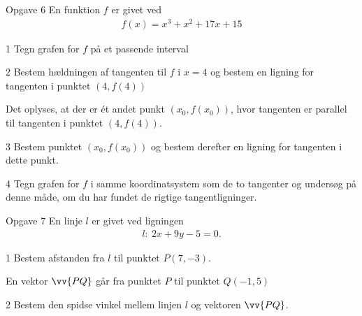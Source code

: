 \begin{opgavetekst}{Opgave 6}
	En funktion $f$ er givet ved
	\begin{align*}
		f(x) = x^3 + x^2 + 17x + 15
	\end{align*}
\end{opgavetekst}
\begin{delopgave}{}{1}
	Tegn grafen for $f$ på et passende interval
\end{delopgave}
\begin{delopgave}{}{2}
	Bestem hældningen af tangenten til $f$ i $x = 4$ og bestem en ligning for tangenten i punktet $(4,f(4))$
\end{delopgave}
\begin{meretekst}
	Det oplyses, at der er ét andet punkt $(x_0,f(x_0))$, hvor tangenten er parallel til tangenten i punktet $(4,f(4))$.
\end{meretekst}
\begin{delopgave}{}{3}
	Bestem punktet $(x_0,f(x_0))$ og bestem derefter en ligning for tangenten i dette punkt.
\end{delopgave}
\begin{delopgave}{}{4}
	Tegn grafen for $f$ i samme koordinatsystem som de to tangenter og undersøg på denne måde, om du har fundet de rigtige tangentligninger.
\end{delopgave}

\begin{opgavetekst}{Opgave 7}
	En linje $l$ er givet ved ligningen
	\begin{align*}
		l: \ 2x+9y-5 = 0.
	\end{align*}
\end{opgavetekst}
\begin{delopgave}{}{1}
	Bestem afstanden fra $l$ til punktet $P(7,-3)$.
\end{delopgave}
\begin{meretekst}
	En vektor $\vv{PQ}$ går fra punktet $P$ til punktet $Q(-1,5)$
\end{meretekst}
\begin{delopgave}{}{2}
	Bestem den spidse vinkel mellem linjen $l$ og vektoren $\vv{PQ}$. 
\end{delopgave}


